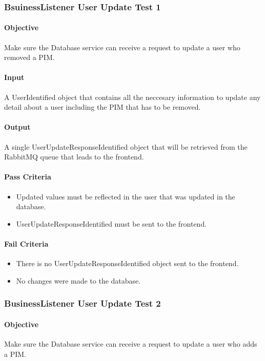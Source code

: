 \documentclass[hidelinks,english]{article}
\begin{document}
				\subsubsection{BsuinessListener User Update Test 1}\label{databasebusinesslistenerupdatetest1}
				\paragraph{Objective} Make sure the Database service can receive a request to update a user who removed a PIM.
				\paragraph{Input} A UserIdentified object that contains all the neccesary information to update any detail about a user including the PIM that has to be removed.
				\paragraph{Output} A single UserUpdateResponseIdentified object that will be retrieved from the RabbitMQ queue that leads to the frontend.
				\paragraph{Pass Criteria}
				\begin{itemize}
					\item Updated values must be reflected in the user that was updated in the database.
					\item UserUpdateResponseIdentified must be sent to the frontend.
				\end{itemize}
				\paragraph{Fail Criteria}
				\begin{itemize}
					\item There is no UserUpdateResponseIdentified object sent to the frontend.
					\item No changes were made to the database.
				\end{itemize}
				
				\subsubsection{BusinessListener User Update Test 2}\label{databasebusinesslistenerupdatetest2}
				\paragraph{Objective} Make sure the Database service can receive a request to update a user who adds a PIM.
\end{document}

